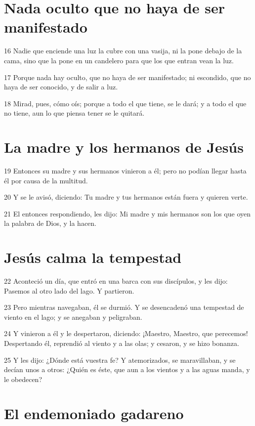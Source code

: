 \section*{Nada oculto que no haya de ser manifestado}

\par 16 Nadie que enciende una luz la cubre con una vasija, ni la pone debajo de la cama, sino que la pone en un candelero para que los que entran vean la luz.
\par 17 Porque nada hay oculto, que no haya de ser manifestado; ni escondido, que no haya de ser conocido, y de salir a luz.
\par 18 Mirad, pues, cómo oís; porque a todo el que tiene, se le dará; y a todo el que no tiene, aun lo que piensa tener se le quitará.

\section*{La madre y los hermanos de Jesús}

\par 19 Entonces su madre y sus hermanos vinieron a él; pero no podían llegar hasta él por causa de la multitud.
\par 20 Y se le avisó, diciendo: Tu madre y tus hermanos están fuera y quieren verte.
\par 21 El entonces respondiendo, les dijo: Mi madre y mis hermanos son los que oyen la palabra de Dios, y la hacen.

\section*{Jesús calma la tempestad}

\par 22 Aconteció un día, que entró en una barca con sus discípulos, y les dijo: Pasemos al otro lado del lago. Y partieron.
\par 23 Pero mientras navegaban, él se durmió. Y se desencadenó una tempestad de viento en el lago; y se anegaban y peligraban.
\par 24 Y vinieron a él y le despertaron, diciendo: ¡Maestro, Maestro, que perecemos! Despertando él, reprendió al viento y a las olas; y cesaron, y se hizo bonanza.
\par 25 Y les dijo: ¿Dónde está vuestra fe? Y atemorizados, se maravillaban, y se decían unos a otros: ¿Quién es éste, que aun a los vientos y a las aguas manda, y le obedecen?

\section*{El endemoniado gadareno}

